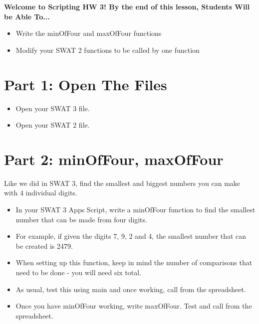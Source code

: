 \documentclass{article}
\newcommand{\AName}{Scripting HW 3}
\begin{document}
\textbf{Welcome to \AName!  By the end of this lesson, Students Will be Able To...}
\begin{itemize}
    \item Write the minOfFour and maxOfFour functions
    \item Modify your SWAT 2 functions to be called by one function
\end{itemize}


\section*{Part 1: Open The Files}
\begin{itemize}
    \item Open your SWAT 3 file.
    \item Open your SWAT 2 file.
\end{itemize}

\section*{Part 2: minOfFour, maxOfFour}
Like we did in SWAT 3, find the smallest and biggest numbers you can make with 4 individual digits.
\begin{itemize}
	\item In your SWAT 3 Apps Script, write a minOfFour function to find the smallest number that can be made from four digits.
	\item For example, if given the digits 7, 9, 2 and 4, the smallest number that can be created is 2479.
	\item When setting up this function, keep in mind the number of comparisons that need to be done - you will need six total.
	\item As usual, test this using main and once working, call from the spreadsheet.
	\item Once you have minOfFour working, write maxOfFour.  Test and call from the spreadsheet.
\end{itemize}
\end{document}
